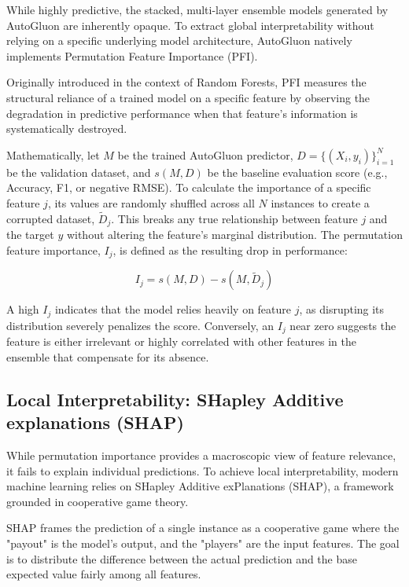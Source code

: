 \documentclass[en,ack]{dimscthesis}
\begin{document}
While highly predictive, the stacked, multi-layer ensemble models generated by AutoGluon are inherently opaque. To extract global interpretability without relying on a specific underlying model architecture, AutoGluon natively implements Permutation Feature Importance (PFI).

Originally introduced in the context of Random Forests, PFI measures the structural reliance of a trained model on a specific feature by observing the degradation in predictive performance when that feature's information is systematically destroyed. 

Mathematically, let $M$ be the trained AutoGluon predictor, $D = \{(X_i, y_i)\}_{i=1}^N$ be the validation dataset, and $s(M, D)$ be the baseline evaluation score (e.g., Accuracy, F1, or negative RMSE). To calculate the importance of a specific feature $j$, its values are randomly shuffled across all $N$ instances to create a corrupted dataset, $\tilde{D}_j$. This breaks any true relationship between feature $j$ and the target $y$ without altering the feature's marginal distribution. The permutation feature importance, $I_j$, is defined as the resulting drop in performance:

\begin{equation}
	I_j = s(M, D) - s(M, \tilde{D}_j)
\end{equation}

A high $I_j$ indicates that the model relies heavily on feature $j$, as disrupting its distribution severely penalizes the score. Conversely, an $I_j$ near zero suggests the feature is either irrelevant or highly correlated with other features in the ensemble that compensate for its absence.

\subsection{Local Interpretability: SHapley Additive explanations (SHAP)}

While permutation importance provides a macroscopic view of feature relevance, it fails to explain individual predictions. To achieve local interpretability, modern machine learning relies on SHapley Additive exPlanations (SHAP), a framework grounded in cooperative game theory.

SHAP frames the prediction of a single instance as a cooperative game where the "payout" is the model's output, and the "players" are the input features. The goal is to distribute the difference between the actual prediction and the base expected value fairly among all features.
\end{document}
